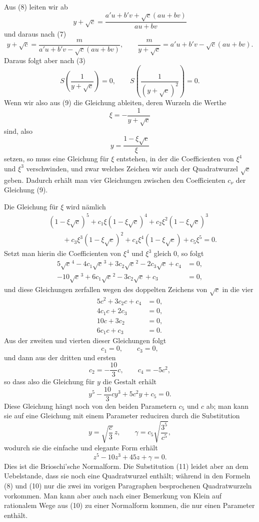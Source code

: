 \documentclass[11pt]{article}
\begin{document}
Aus (8) leiten wir ab
\[
 y+\sqrt c=\frac{a'u+b'v+\sqrt c(au+bv)}{au+bv}
\]
und daraus nach (7)
\[
 y+\sqrt c=\frac{m}{a'u+b'v-\sqrt c(au+bv)},
\qquad
\frac{m}{y+\sqrt c}=a'u+b'v-\sqrt c(au+bv).
\]
Daraus folgt aber nach (3)
\[
 S\left(\frac1{y+\sqrt c}\right)=0,
 \qquad
 S\left(\frac1{(y+\sqrt c)^2}\right)=0.
\]
Wenn wir also aus (9) die Gleichung ableiten, deren Wurzeln die Werthe
\[
 \xi=-\frac1{y+\sqrt c}
\]
sind, also
\[
 y=\frac{1-\xi\sqrt c}{\xi}
\]
setzen, so muss eine Gleichung für $\xi$ entstehen, in der die Coefficienten von $\xi^4$ und $\xi^3$ verschwinden, und zwar welches Zeichen wir auch der Quadratwurzel $\sqrt c$ geben. Dadurch erhält man vier Gleichungen zwischen den Coefficienten $c_\nu$ der Gleichung (9).

Die Gleichung für $\xi$ wird nämlich
\[
\begin{aligned}
&(1-\xi\sqrt c)^5+c_1\xi(1-\xi\sqrt c)^4+c_2\xi^2(1-\xi\sqrt c)^3\\
&\qquad +c_3\xi^3(1-\xi\sqrt c)^2+c_4\xi^4(1-\xi\sqrt c)+c_5\xi^5=0.
\end{aligned}
\]
Setzt man hierin die Coefficienten von $\xi^4$ und $\xi^3$ gleich $0$, so folgt
\[
\begin{aligned}
5\sqrt c^{\,4}-4c_1\sqrt c^{\,3}+3c_2\sqrt c^{\,2}-2c_3\sqrt c+c_4&=0,\\
-10\sqrt c^{\,3}+6c_1\sqrt c^{\,2}-3c_2\sqrt c+c_3&=0,
\end{aligned}
\]
und diese Gleichungen zerfallen wegen des doppelten Zeichens von $\sqrt c$ in die vier
\[
\begin{aligned}
5c^2+3c_2c+c_4&=0,\\
4c_1c+2c_3&=0,\\
10c+3c_2&=0,\\
6c_1c+c_3&=0.
\end{aligned}
\]
Aus der zweiten und vierten dieser Gleichungen folgt
\[
 c_1=0,
 \qquad c_3=0,
\]
und dann aus der dritten und ersten
\[
 c_2=-\frac{10}{3}c,
 \qquad c_4=-5c^2,
\]
so dass also die Gleichung für $y$ die Gestalt erhält
\begin{equation}
 y^5-\frac{10}{3}cy^3+5c^2y+c_5=0.
\tag{10}
\end{equation}
Diese Gleichung hängt noch von den beiden Parametern $c_5$ und $c$ ab; man kann sie auf eine Gleichung mit einem Parameter reduciren durch die Substitution
\begin{equation}
 y=\sqrt{\frac c3}\,z,
 \qquad
 \gamma=c_5\sqrt{\frac{3^5}{c^5}},
\tag{11}
\end{equation}
wodurch sie die einfache und elegante Form erhält
\begin{equation}
 z^5-10z^3+45z+\gamma=0.
\tag{12}
\end{equation}
Dies ist die Brioschi'sche Normalform. Die Substitution (11) leidet aber an dem Uebelstande, dass sie noch eine Quadratwurzel enthält; während in den Formeln (8) und (10) nur die zwei im vorigen Paragraphen besprochenen Quadratwurzeln vorkommen. Man kann aber auch nach einer Bemerkung von Klein auf rationalem Wege aus (10) zu einer Normalform kommen, die nur einen Parameter enthält.
\end{document}
